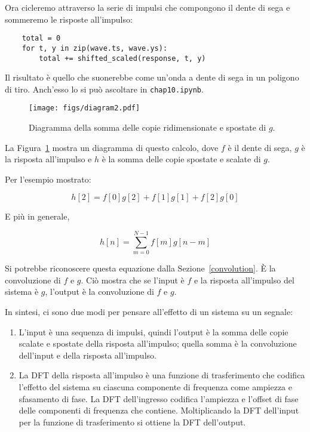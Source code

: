 \documentclass[12pt]{book} \usepackage[width=5.5in,height=8.5in, hmarginratio=3:2,vmarginratio=1:1]{geometry}
\begin{document}
Ora cicleremo attraverso la serie di impulsi che compongono il dente di sega e sommeremo le risposte all'impulso:

\begin{verbatim} 
    total = 0
    for t, y in zip(wave.ts, wave.ys):
        total += shifted_scaled(response, t, y)
 \end{verbatim} 

Il risultato è quello che suonerebbe come un'onda a dente di sega in un poligono di tiro. Anch'esso lo si può ascoltare in {\tt chap10.ipynb}.

\begin{figure} \centerline{\texttt{[image: figs/diagram2.pdf]}} \caption{Diagramma della somma delle copie ridimensionate e spostate di $g$.} \label{fig.convolution} \end{figure} 

La Figura~\ref{fig.convolution} mostra un diagramma di questo calcolo, dove $f$ è il dente di sega, $g$ è la risposta all'impulso e $h$ è la somma delle copie spostate e scalate di $g$.

Per l'esempio mostrato:

\[ h[2] = f[0]g[2] + f[1]g[1] + f[2]g[0] \] 

E più in generale,

\[ h[n] = \sum_{m=0}^{N-1} f[m] g[n-m] \] 

Si potrebbe riconoscere questa equazione dalla Sezione~\ref{convolution}. È la convoluzione di $f$ e $g$. Ciò mostra che se l'input è $f$ e la risposta all'impulso del sistema è $g$, l'output è la convoluzione di $f$ e $g$.

In sintesi, ci sono due modi per pensare all'effetto di un sistema su un segnale:

\begin{enumerate} 

\item L'input è una sequenza di impulsi, quindi l'output è la somma delle copie scalate e spostate della risposta all'impulso; quella somma è la convoluzione dell'input e della risposta all'impulso.

\item La DFT della risposta all'impulso è una funzione di trasferimento che codifica l'effetto del sistema su ciascuna componente di frequenza come ampiezza e sfasamento di fase. La DFT dell'ingresso codifica l'ampiezza e l'offset di fase delle componenti di frequenza che contiene. Moltiplicando la DFT dell'input per la funzione di trasferimento si ottiene la DFT dell'output.

\end{enumerate} 
\end{document}
